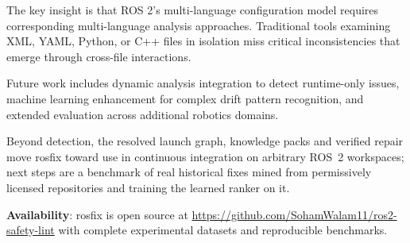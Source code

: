 \documentclass[conference]{IEEEtran}
\begin{document}
The key insight is that ROS 2's multi-language configuration model requires corresponding
multi-language analysis approaches. Traditional tools examining XML, YAML, Python, or C++ files in
isolation miss critical inconsistencies that emerge through cross-file interactions.

Future work includes dynamic analysis integration to detect runtime-only issues, machine learning
enhancement for complex drift pattern recognition, and extended evaluation across additional
robotics domains.

Beyond detection, the resolved launch graph, knowledge packs and verified repair move rosfix
toward use in continuous integration on arbitrary ROS~2 workspaces; next steps are a benchmark of
real historical fixes mined from permissively licensed repositories and training the learned
ranker on it.

\textbf{Availability}: rosfix is open source at
\url{https://github.com/SohamWalam11/ros2-safety-lint} with complete experimental datasets and
reproducible benchmarks.



\end{document}
